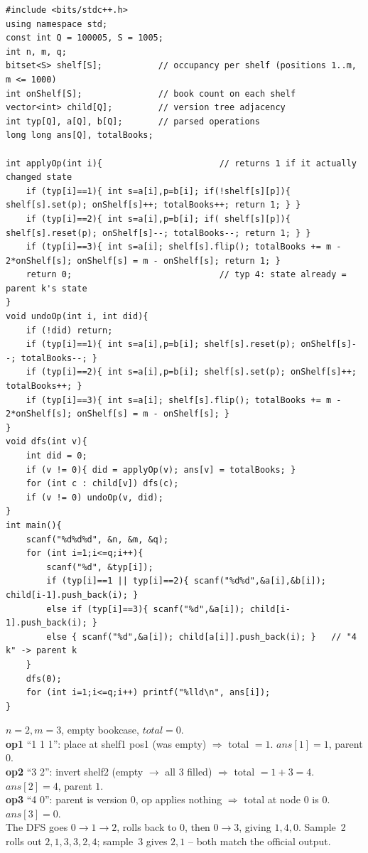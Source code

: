 \begin{lstlisting}[caption={CF 707D: build the version tree, DFS with rollback over per-shelf bitsets and a running total}, label={lst:c19-707-soln}]
#include <bits/stdc++.h>
using namespace std;
const int Q = 100005, S = 1005;
int n, m, q;
bitset<S> shelf[S];           // occupancy per shelf (positions 1..m, m <= 1000)
int onShelf[S];               // book count on each shelf
vector<int> child[Q];         // version tree adjacency
int typ[Q], a[Q], b[Q];       // parsed operations
long long ans[Q], totalBooks;

int applyOp(int i){                       // returns 1 if it actually changed state
    if (typ[i]==1){ int s=a[i],p=b[i]; if(!shelf[s][p]){ shelf[s].set(p); onShelf[s]++; totalBooks++; return 1; } }
    if (typ[i]==2){ int s=a[i],p=b[i]; if( shelf[s][p]){ shelf[s].reset(p); onShelf[s]--; totalBooks--; return 1; } }
    if (typ[i]==3){ int s=a[i]; shelf[s].flip(); totalBooks += m - 2*onShelf[s]; onShelf[s] = m - onShelf[s]; return 1; }
    return 0;                             // typ 4: state already = parent k's state
}
void undoOp(int i, int did){
    if (!did) return;
    if (typ[i]==1){ int s=a[i],p=b[i]; shelf[s].reset(p); onShelf[s]--; totalBooks--; }
    if (typ[i]==2){ int s=a[i],p=b[i]; shelf[s].set(p); onShelf[s]++; totalBooks++; }
    if (typ[i]==3){ int s=a[i]; shelf[s].flip(); totalBooks += m - 2*onShelf[s]; onShelf[s] = m - onShelf[s]; }
}
void dfs(int v){
    int did = 0;
    if (v != 0){ did = applyOp(v); ans[v] = totalBooks; }
    for (int c : child[v]) dfs(c);
    if (v != 0) undoOp(v, did);
}
int main(){
    scanf("%d%d%d", &n, &m, &q);
    for (int i=1;i<=q;i++){
        scanf("%d", &typ[i]);
        if (typ[i]==1 || typ[i]==2){ scanf("%d%d",&a[i],&b[i]); child[i-1].push_back(i); }
        else if (typ[i]==3){ scanf("%d",&a[i]); child[i-1].push_back(i); }
        else { scanf("%d",&a[i]); child[a[i]].push_back(i); }   // "4 k" -> parent k
    }
    dfs(0);
    for (int i=1;i<=q;i++) printf("%lld\n", ans[i]);
}
\end{lstlisting}

\begin{tracebox}[CF 707D sample 1: n=2, m=3; ops 1 1 1 / 3 2 / 4 0]
\(n=2,m=3\), empty bookcase, \(\mathit{total}=0\).\\
\textbf{op1} ``1 1 1'': place at shelf1 pos1 (was empty) \(\Rightarrow\) total \(=1\). \(\mathit{ans}[1]=\boxed{1}\), parent \(0\).\\
\textbf{op2} ``3 2'': invert shelf2 (empty \(\to\) all 3 filled) \(\Rightarrow\) total \(=1+3=4\). \(\mathit{ans}[2]=\boxed{4}\), parent \(1\).\\
\textbf{op3} ``4 0'': parent is version \(0\), op applies nothing \(\Rightarrow\) total at node \(0\) is \(0\). \(\mathit{ans}[3]=\boxed{0}\).\\
The DFS goes \(0\!\to\!1\!\to\!2\), rolls back to \(0\), then \(0\!\to\!3\), giving \(1,4,0\).  Sample~2 rolls out \(2,1,3,3,2,4\); sample~3 gives \(2,1\) -- both match the official output.
\end{tracebox}


